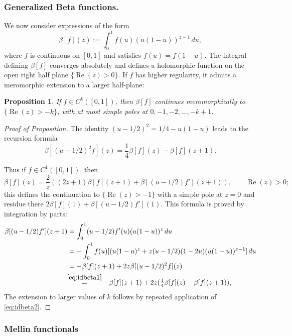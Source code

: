 \documentclass[JEP,XML,SOM,Unicode,NoFloatCountersInSection, NoEqCountersInSection,published]{cedram}
\DeclareMathOperator{\Real}{Re}
\theoremstyle{plain}
\newtheorem{Proposition}[Theorem]{Proposition}
\theoremstyle{definition}
\theoremstyle{remark}
\begin{document}
\subsubsection*{Generalized Beta functions.}
We now consider expressions of the form
\begin{equation*}
\beta[f](z) := \int_0^1 f(u) (u(1-u))^{z-1}\,du,
\end{equation*}
where $f$ is continuous on $[0,1]$ and satisfies $f(u) = f(1-u)$. The integral defining $\beta[f]$ converges absolutely and defines a holomorphic function
on the open right half plane $\{\Real(z)>0\}$. If $f$ has higher regularity, it admits a meromorphic extension to a larger half-plane:
\begin{Proposition}\label{prop:merocont}
If $f\in C^k([0,1])$, then $\beta[f]$ continues meromorphically to $\{\Real(z)>-k\}$, with at most simple poles at $0, -1, -2, \dots, -k+1$.
\end{Proposition}
\begin{proof}[Proof of Proposition]
The identity $(u-1/2)^2 = 1/4 - u(1-u)$ leads to the recursion formula
\begin{equation}
\beta[(u-1/2)^2 f](z) = \frac{1}{4} \beta[f](z) - \beta[f] (z+1).
\label{eq:idbeta1}
\end{equation}

Thus if $f\in C^1([0,1])$, then
\begin{equation}
\beta[f](z) = \frac{2}{z} \left((2z+1) \beta[f] (z+1) + \beta[(u-1/2)f'] (z+1) \right), \qquad \Real(z)>0;
\label{eq:idbeta2}
\end{equation}
this defines the continuation to $\{\Real(z)>-1\}$ with a simple pole at $z=0$ and residue there
$2\beta[f](1) + \beta[(u-1/2)f'](1)$. This formula is proved by integration by parts:
\begin{align*}
\beta[(u-1/2)f'](z+1) &= \int_0^1 (u-1/2)f'(u) (u(1-u))^z\,du \\
&= - \int_0^1 f(u) [(u(1-u)^z + z (u-1/2)(1-2u) (u(1-u))^{z-1}]\,du \\
&= - \beta[f] (z+1) + 2z \beta[(u-1/2)^2 f](z) \\
&\!\!\stackrel{\eqref{eq:idbeta1}}{=} - \beta[f] (z+1) + 2z (\tfrac{1}{4} \beta[f](z) - \beta[f] (z+1)),
\end{align*}
The extension to larger values of $k$ follows by repeated application of \eqref{eq:idbeta2}.
\end{proof}

\subsubsection{Mellin functionals} \label{sec:Mellin}
\end{document}
